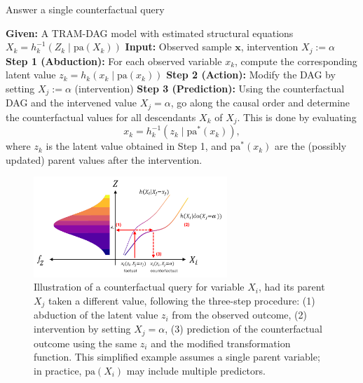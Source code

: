 \begin{algorithm}
\caption{Answer a single counterfactual query}
\label{alg:single_cf}
\begin{algorithmic}
\State \textbf{Given:} A TRAM-DAG model with estimated structural equations $X_k = h_k^{-1}(Z_k \mid \text{pa}(X_k))$
\State \textbf{Input:} Observed sample $\mathbf{x}$, intervention $X_j := \alpha$
\vspace{0.3em}
\State \textbf{Step 1 (Abduction):} For each observed variable $x_k$, compute the corresponding latent value $z_k = h_k(x_k \mid \text{pa}(x_k))$
\vspace{0.3em}
\State \textbf{Step 2 (Action):} Modify the DAG by setting $X_j := \alpha$ (intervention)
\vspace{0.3em}
\State \textbf{Step 3 (Prediction):} Using the counterfactual DAG and the intervened value $X_j = \alpha$, go along the causal order and determine the counterfactual values for all descendants $X_k$ of $X_j$. This is done by evaluating
\[
x_k = h_k^{-1}(z_k \mid \text{pa}^*(x_k)),
\]
where $z_k$ is the latent value obtained in Step 1, and $\text{pa}^*(x_k)$ are the (possibly updated) parent values after the intervention.
\end{algorithmic}
\end{algorithm}

\begin{figure}[H]
\centering
\includegraphics[width=0.65\textwidth]{img/counterfactuals.png}
\caption{Illustration of a counterfactual query for variable $X_i$, had its parent $X_j$ taken a different value, following the three-step procedure: (1) abduction of the latent value $z_i$ from the observed outcome, (2) intervention by setting $X_j = \alpha$, (3) prediction of the counterfactual outcome using the same $z_i$ and the modified transformation function. This simplified example assumes a single parent variable; in practice, $\text{pa}(X_i)$ may include multiple predictors.}
\label{fig:cf_viz}
\end{figure}



